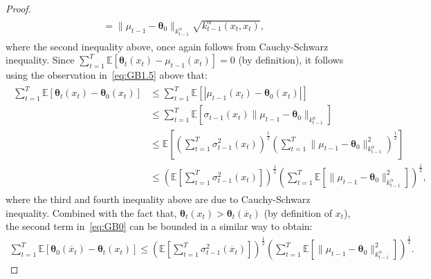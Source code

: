 \documentclass[final,12pt]{colt2026} %
\begin{document}
\begin{proof}
\begin{align}
\begin{split}
        &=\|\mu_{t-1}-\pmb \theta_0\|_{k_{t-1}^{\alpha}} \sqrt{k_{t-1}^{\alpha}(x_t,x
     _t)},
    \end{split}
\end{align}
where the second inequality above, once again follows from Cauchy-Schwarz inequality. Since \(\sum_{t=1}^{T} \mathbb{E}\left[\pmb \theta_t(x_t) - \mu_{t-1}(x_t)\right]= 0\) (by definition), it follows using the observation in~\eqref{eq:GB1.5} above that:
    \begin{align}\label{eq:GB2}
    \begin{split}
        \sum_{t=1}^T \mathbb{E} \left[\pmb \theta_t(x_t) -   \pmb \theta_0(x_t)\right] & \leq  \sum_{t=1}^T \mathbb{E} \left[  \left|\mu_{t-1}(x_t) -   \pmb \theta_0(x_t)\right|  \right]\\ 
       & \leq  \sum_{t=1}^T \mathbb{E} \left[ \sigma_{t-1}(x_t) \|\mu_{t-1} -\pmb \theta_0 \|_{k_{t-1}^{\alpha}} \right] 
       \\
       &\leq  \mathbb{E} \left[\left( \sum_{t=1}^T \sigma_{t-1}^2(x_t) \right)^{\frac{1}{2}} \left(  \sum_{t=1}^T \|\mu_{t-1} -\pmb \theta_0 \|_{k_{t-1}^{\alpha}}^2 \right)^{\frac{1}{2}}\right] 
       \\
       &\leq   \left( \mathbb{E} \left[ \sum_{t=1}^T \sigma_{t-1}^2(x_t)\right]  \right)^{\frac{1}{2}} \left(   \sum_{t=1}^T  \mathbb{E} \left[\| \mu_{t-1} -\pmb \theta_0 \|_{k_{t-1}^{\alpha}}^2 \right] \right)^{\frac{1}{2}},
    \end{split}
    \end{align}
where the third and fourth inequality above are due to Cauchy-Schwarz inequality. %
Combined with the fact that, $\pmb \theta_t(x_t) > \pmb \theta_t(\overline{x}_t)$ (by definition of $x_t$), the second term in~\eqref{eq:GB0} can be bounded in a similar way to obtain:
    \begin{align}
        \sum_{t=1}^{T} \mathbb{E}\left[ \pmb \theta_0(\overline{x}_t) -   \pmb \theta_t(x_t) \right] \leq   \left( \mathbb{E} \left[ \sum_{t=1}^T \sigma_{t-1}^2(\overline{x}_t)\right]  \right)^{\frac{1}{2}} \left(   \sum_{t=1}^T  \mathbb{E} \left[\|\mu_{t-1} -\pmb \theta_0 \|_{k_{t-1}^{\alpha}}^2 \right] \right)^{\frac{1}{2}}.

\end{align}
\end{proof}
\end{document}
